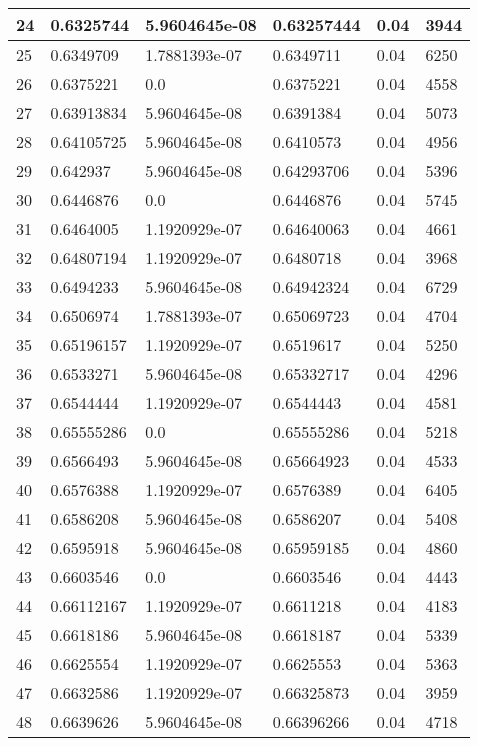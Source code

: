 \begin{longtable}{|l|l|l|l|l|l|}
24 & 0.6325744 & 5.9604645e-08 & 0.63257444 & 0.04 & 3944 \\ \hline 
25 & 0.6349709 & 1.7881393e-07 & 0.6349711 & 0.04 & 6250 \\ \hline 
26 & 0.6375221 & 0.0 & 0.6375221 & 0.04 & 4558 \\ \hline 
27 & 0.63913834 & 5.9604645e-08 & 0.6391384 & 0.04 & 5073 \\ \hline 
28 & 0.64105725 & 5.9604645e-08 & 0.6410573 & 0.04 & 4956 \\ \hline 
29 & 0.642937 & 5.9604645e-08 & 0.64293706 & 0.04 & 5396 \\ \hline 
30 & 0.6446876 & 0.0 & 0.6446876 & 0.04 & 5745 \\ \hline 
31 & 0.6464005 & 1.1920929e-07 & 0.64640063 & 0.04 & 4661 \\ \hline 
32 & 0.64807194 & 1.1920929e-07 & 0.6480718 & 0.04 & 3968 \\ \hline 
33 & 0.6494233 & 5.9604645e-08 & 0.64942324 & 0.04 & 6729 \\ \hline 
34 & 0.6506974 & 1.7881393e-07 & 0.65069723 & 0.04 & 4704 \\ \hline 
35 & 0.65196157 & 1.1920929e-07 & 0.6519617 & 0.04 & 5250 \\ \hline 
36 & 0.6533271 & 5.9604645e-08 & 0.65332717 & 0.04 & 4296 \\ \hline 
37 & 0.6544444 & 1.1920929e-07 & 0.6544443 & 0.04 & 4581 \\ \hline 
38 & 0.65555286 & 0.0 & 0.65555286 & 0.04 & 5218 \\ \hline 
39 & 0.6566493 & 5.9604645e-08 & 0.65664923 & 0.04 & 4533 \\ \hline 
40 & 0.6576388 & 1.1920929e-07 & 0.6576389 & 0.04 & 6405 \\ \hline 
41 & 0.6586208 & 5.9604645e-08 & 0.6586207 & 0.04 & 5408 \\ \hline 
42 & 0.6595918 & 5.9604645e-08 & 0.65959185 & 0.04 & 4860 \\ \hline 
43 & 0.6603546 & 0.0 & 0.6603546 & 0.04 & 4443 \\ \hline 
44 & 0.66112167 & 1.1920929e-07 & 0.6611218 & 0.04 & 4183 \\ \hline 
45 & 0.6618186 & 5.9604645e-08 & 0.6618187 & 0.04 & 5339 \\ \hline 
46 & 0.6625554 & 1.1920929e-07 & 0.6625553 & 0.04 & 5363 \\ \hline 
47 & 0.6632586 & 1.1920929e-07 & 0.66325873 & 0.04 & 3959 \\ \hline 
48 & 0.6639626 & 5.9604645e-08 & 0.66396266 & 0.04 & 4718 \\ \hline 

\end{longtable}
